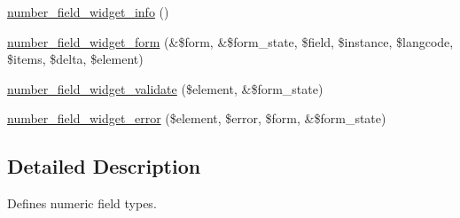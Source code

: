 \begin{DoxyCompactItemize}
\item 
\hyperlink{number_8module_a799dffc561bbf06c81daff818fcf1b2b}{number\_\-field\_\-widget\_\-info} ()
\item 
\hyperlink{number_8module_ab84d799cde19aca21bb03a24405d299d}{number\_\-field\_\-widget\_\-form} (\&\$form, \&\$form\_\-state, \$field, \$instance, \$langcode, \$items, \$delta, \$element)
\item 
\hyperlink{number_8module_a5e6fcb69b6cf24878a912017340be3dd}{number\_\-field\_\-widget\_\-validate} (\$element, \&\$form\_\-state)
\item 
\hyperlink{number_8module_a7c084f833f08a44f5de81e135a447955}{number\_\-field\_\-widget\_\-error} (\$element, \$error, \$form, \&\$form\_\-state)
\end{DoxyCompactItemize}


\subsection{Detailed Description}
Defines numeric field types. 

